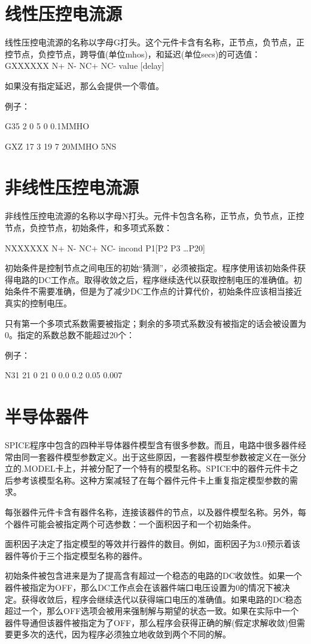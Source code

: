 \section{线性压控电流源}
线性压控电流源的名称以字母G打头。这个元件卡含有名称，正节点，负节点，正控节点，负控节点，跨导值(单位mhos)，和延迟(单位secs)的可选值：
GXXXXXX N+ N- NC+ NC- value [delay]

如果没有指定延迟，那么会提供一个零值。

例子：

G35 2 0 5 0 0.1MMHO

GXZ 17 3 19 7 20MMHO 5NS

\section{非线性压控电流源}
非线性压控电流源的名称以字母N打头。元件卡包含名称，正节点，负节点，正控节点，负控节点，初始条件，和多项式系数：

NXXXXXX N+ N- NC+ NC- incond P1[P2 P3 \dots P20]

初始条件是控制节点之间电压的初始“猜测”，必须被指定。程序使用该初始条件获得电路的DC工作点。取得收敛之后，程序继续迭代以获取控制电压的准确值。初始条件不需要准确，但是为了减少DC工作点的计算代价，初始条件应该相当接近真实的控制电压。

只有第一个多项式系数需要被指定；剩余的多项式系数没有被指定的话会被设置为0。指定的系数总数不能超过20个：

例子：

N31 21 0 21 0 0.0 0.2 0.05 0.007

\section{半导体器件}
SPICE程序中包含的四种半导体器件模型含有很多参数。而且，电路中很多器件经常由同一套器件模型参数定义。出于这些原因，一套器件模型参数被定义在一张分立的.MODEL卡上，并被分配了一个特有的模型名称。SPICE中的器件元件卡之后参考该模型名称。这种方案减轻了在每个器件元件卡上重复指定模型参数的需求。

每张器件元件卡含有器件名称，连接该器件的节点，以及器件模型名称。另外，每个器件可能会被指定两个可选参数：一个面积因子和一个初始条件。

面积因子决定了指定模型的等效并行器件的数目。例如，面积因子为3.0预示着该器件等价于三个指定模型名称的器件。

初始条件被包含进来是为了提高含有超过一个稳态的电路的DC收敛性。如果一个器件被指定为OFF，那么DC工作点会在该器件端口电压设置为0的情况下被决定。获得收敛后，程序会继续迭代以获得端口电压的准确值。如果电路的DC稳态超过一个，那么OFF选项会被用来强制解与期望的状态一致。如果在实际中一个器件导通但该器件被指定为了OFF，那么程序会获得正确的解(假定求解收敛)但需要更多次的迭代，因为程序必须独立地收敛到两个不同的解。

